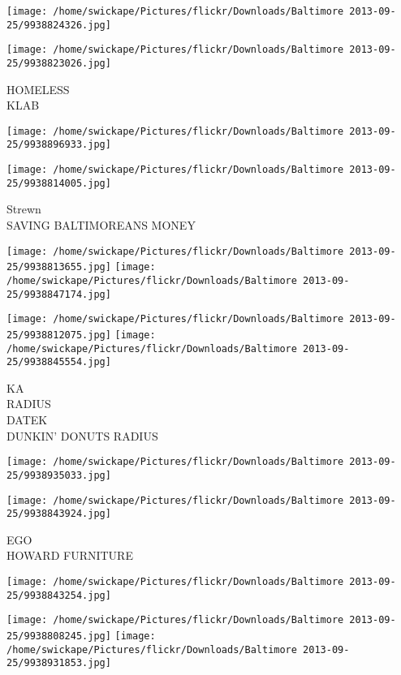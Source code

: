 \documentclass[10pt,letterpaper]{article}
\begin{document}
\texttt{[image: /home/swickape/Pictures/flickr/Downloads/Baltimore 2013-09-25/9938824326.jpg]}

\vspace{0.25in}
\texttt{[image: /home/swickape/Pictures/flickr/Downloads/Baltimore 2013-09-25/9938823026.jpg]}

HOMELESS\\
KLAB
\pagebreak

\texttt{[image: /home/swickape/Pictures/flickr/Downloads/Baltimore 2013-09-25/9938896933.jpg]}

\vspace{0.25in}
\texttt{[image: /home/swickape/Pictures/flickr/Downloads/Baltimore 2013-09-25/9938814005.jpg]}

Strewn\\
SAVING BALTIMOREANS MONEY
\pagebreak

\texttt{[image: /home/swickape/Pictures/flickr/Downloads/Baltimore 2013-09-25/9938813655.jpg]}
\texttt{[image: /home/swickape/Pictures/flickr/Downloads/Baltimore 2013-09-25/9938847174.jpg]}

\texttt{[image: /home/swickape/Pictures/flickr/Downloads/Baltimore 2013-09-25/9938812075.jpg]}
\texttt{[image: /home/swickape/Pictures/flickr/Downloads/Baltimore 2013-09-25/9938845554.jpg]}

KA\\
RADIUS\\
DATEK\\
DUNKIN' DONUTS RADIUS
\pagebreak

\texttt{[image: /home/swickape/Pictures/flickr/Downloads/Baltimore 2013-09-25/9938935033.jpg]}

\vspace{0.25in}
\texttt{[image: /home/swickape/Pictures/flickr/Downloads/Baltimore 2013-09-25/9938843924.jpg]}

EGO\\
HOWARD FURNITURE
\pagebreak

\texttt{[image: /home/swickape/Pictures/flickr/Downloads/Baltimore 2013-09-25/9938843254.jpg]}

\vspace{0.25in}
\texttt{[image: /home/swickape/Pictures/flickr/Downloads/Baltimore 2013-09-25/9938808245.jpg]}
\texttt{[image: /home/swickape/Pictures/flickr/Downloads/Baltimore 2013-09-25/9938931853.jpg]}
\end{document}
